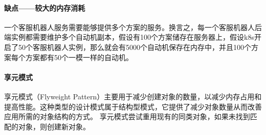 \documentclass[hyperref]{ctexart}
\begin{document}
\paragraph{缺点——较大的内存消耗}
一个客服机器人服务需要能够提供多个方案的服务。换言之，每一个客服机器人后端实例都需要维护多个自动机副本，假设有100个方案储存在服务器上，假设k8s开启了50个客服机器人实例，那么就会有5000个自动机保存在内存中，并且100个方案每个方案都有50个一模一样的自动机。
\paragraph{享元模式}
享元模式（Flyweight Pattern）主要用于减少创建对象的数量，以减少内存占用和提高性能。这种类型的设计模式属于结构型模式，它提供了减少对象数量从而改善应用所需的对象结构的方式。
享元模式尝试重用现有的同类对象，如果未找到匹配的对象，则创建新对象。
\end{document}
